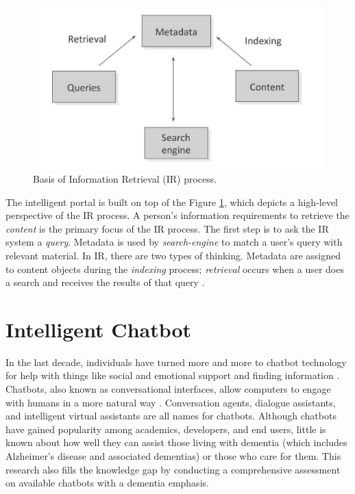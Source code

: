 \begin{figure}
	\includegraphics[width=\linewidth]{irprocess}
	\caption{Basis of Information Retrieval (IR) process.}
	\label{fig:1}
\end{figure}

The intelligent portal is built on top of the Figure \ref{fig:1}, which depicts a high-level perspective of the IR process. A person's information requirements to retrieve the \textit{content} is the primary focus of the IR process. The first step is to ask the IR system a \textit{query}. Metadata is used by \textit{search-engine} to match a user's query with relevant material. In IR, there are two types of thinking. Metadata are assigned to content objects during the \textit{indexing} process; \textit{retrieval} occurs when a user does a search and receives the results of that query \citep{prob2}.

\section{Intelligent Chatbot}

In the last decade, individuals have turned more and more to chatbot technology for help with things like social and emotional support and finding information \citep{chat1}. Chatbots, also known as conversational interfaces, allow computers to engage with humans in a more natural way \citep{chat2}. Conversation agents, dialogue assistants, and intelligent virtual assistants are all names for chatbots. Although chatbots have gained popularity among academics, developers, and end users, little is known about how well they can assist those living with dementia (which includes Alzheimer's disease and associated dementias) or those who care for them. This research also fills the knowledge gap by conducting a comprehensive assessment on available chatbots with a dementia emphasis.

